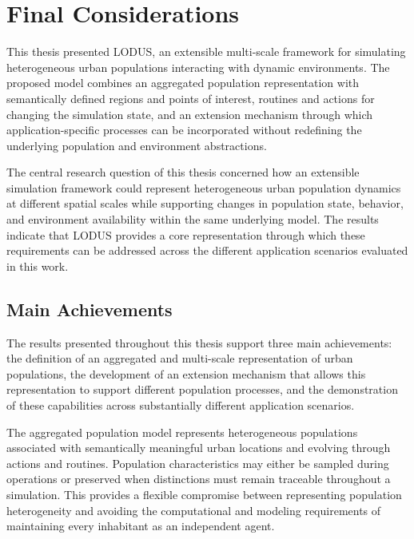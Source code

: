 \chapter{Final Considerations}
\label{chapter:final_considerations}

This thesis presented LODUS, an extensible multi-scale framework for simulating heterogeneous urban populations interacting with dynamic environments. The proposed model combines an aggregated population representation with semantically defined regions and points of interest, routines and actions for changing the simulation state, and an extension mechanism through which application-specific processes can be incorporated without redefining the underlying population and environment abstractions.

The central research question of this thesis concerned how an extensible simulation framework could represent heterogeneous urban population dynamics at different spatial scales while supporting changes in population state, behavior, and environment availability within the same underlying model. The results indicate that LODUS provides a core representation through which these requirements can be addressed across the different application scenarios evaluated in this work. %



\section{Main Achievements}
\label{sec:final_discussion}


The results presented throughout this thesis support three main achievements:
the definition of an aggregated and multi-scale representation of urban populations,
the development of an extension mechanism that allows this representation to support
different population processes, and the demonstration of these capabilities across
substantially different application scenarios.

The aggregated population model represents heterogeneous populations associated
with semantically meaningful urban locations and evolving through actions and
routines. Population characteristics may either be sampled during operations or
preserved when distinctions must remain traceable throughout a simulation. This
provides a flexible compromise between representing population heterogeneity and
avoiding the computational and modeling requirements of maintaining every inhabitant
as an independent agent.

